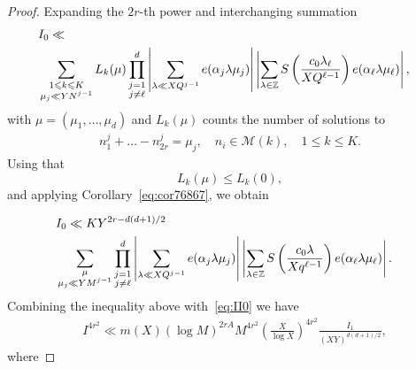 \documentclass[12pt]{amsart}
\def\cM{{\mathcal M}}
\def\Z{{\mathbb Z}}
\def\\{\cr}
\def\le{\leqslant}
\begin{document}
\begin{proof}
Expanding the $2r$-th power and interchanging summation 
\begin{align*}
&I_0\ll \\ &\sum_{\substack{1\le k \le K\\ \mu_j\ll YN^{j-1}}}L_k(\mu)\prod_{\substack{j=1 \\ j\neq \ell }}^{d}\left|\sum_{\lambda\ll XQ^{j-1}}e(\alpha_j \lambda \mu_j)\right|\left|\sum_{\lambda \in \Z}S\left(\frac{c_0\lambda_{\ell}}{XQ^{\ell-1}}\right)e(\alpha_\ell \lambda \mu_\ell)\right|,
\end{align*}
with $\mu=(\mu_1,\dots,\mu_d)$ and $L_k(\mu)$ counts the number of solutions to 
\begin{align*}
n^{j}_1+\dots-n_{2r}^{j}=\mu_j, \quad n_i\in \cM(k), \quad 1\le k \le K.
\end{align*}
Using that 
$$L_k(\mu)\le L_k(0),$$
and applying Corollary~\ref{eq:cor76867}, we obtain

\begin{align*}
& I_0\ll KY^{2r-d(d+1)/2} \\ & \sum_{\substack{\mu \\ \mu_j \ll YM^{j-1}}}\prod_{\substack{j=1 \\ j\neq \ell }}^{d}\left|\sum_{\lambda \ll XQ^{j-1}}e(\alpha_j \lambda \mu_j)\right|\left|\sum_{\lambda \in \Z}S\left(\frac{c_0\lambda}{Xq^{\ell-1}}\right)e(\alpha_\ell \lambda \mu_\ell)\right|.
\end{align*}
Combining the inequality above with~\eqref{eq:II0} we have 
\begin{align}
\label{eq:II1}
& I^{4r^2}\ll m(X)(\log{M})^{2rA}M^{4r^2}\left(\frac{X}{\log{X}}\right)^{4r^2}\frac{I_1}{(XY)^{d(d+1)/2}},
\end{align}
where 


\end{proof}
\end{document}
